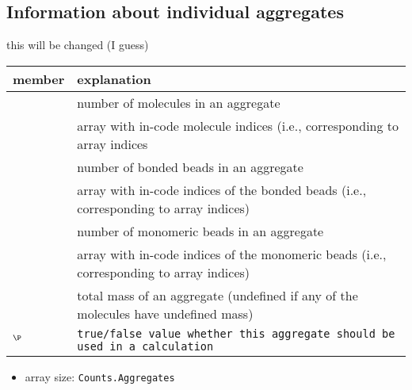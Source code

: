 \subsection[Aggregate]{Information about individual
  aggregates}\label{ssec:Aggregates}
\TODO this will be changed (I guess)
 \\
\vspace{-1.75em}
\begin{longtable}{L{0.27\textwidth}p{0.755\textwidth}}
  \toprule
  member             & explanation \\
  \midrule
   & number of molecules in an aggregate\\
   & array with in-code molecule indices (i.e.,
                          corresponding to  array indices\\
       & number of bonded beads in an aggregate\\
       & array with in-code indices of the bonded beads (i.e.,
                          corresponding to  array indices)\\
    & number of monomeric beads in an aggregate\\
    & array with in-code indices of the monomeric beads
                          (i.e., corresponding to  array
                          indices)\\
      & total mass of an aggregate (undefined if any of
                          the molecules have undefined mass)\\
  $^\P$  & \tt{true}/\tt{false} value whether this aggregate
                          should be used in a calculation\\
  \bottomrule
\end{longtable}
\begin{itemize}
  \item array size: \tt{Counts.Aggregates}
\end{itemize} %
